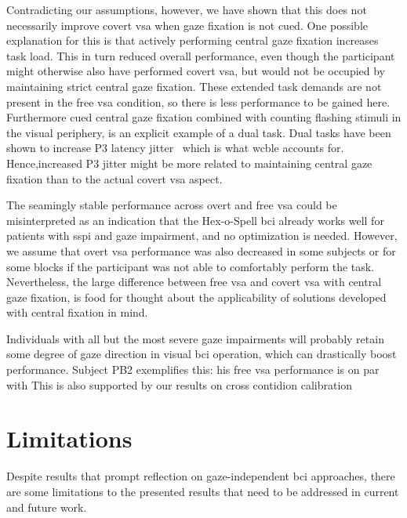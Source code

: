 Contradicting our assumptions, however, we have shown that this does not
necessarily improve covert \ac{vsa} when gaze fixation is not cued.
One possible explanation for this is that actively performing central gaze fixation
increases task load.
This in turn reduced overall performance, even though the participant might
otherwise also have performed covert \ac{vsa}, but would not be occupied by
maintaining strict central gaze fixation.
These extended task demands are not present in the free \ac{vsa} condition, so
there is less performance to be gained here.
Furthermore cued central gaze fixation combined with counting flashing stimuli
in the visual periphery, is an explicit example of a dual task.
Dual tasks have been shown to increase P3 latency
jitter~\cite{Polich2007,Arico2014, VanDenKerchove2024}
which is what \ac{wcble} accounts for.
Hence,increased P3 jitter might be more related to maintaining central gaze fixation
than to the actual covert \ac{vsa} aspect.

The seamingly stable performance across overt and free \ac{vsa} could be
misinterpreted as an indication that the Hex-o-Spell \ac{bci} already works
well for patients with \ac{sspi} and gaze impairment, and no optimization is
needed.
However, we assume that overt \ac{vsa} performance was also decreased in some
subjects or for some blocks if the participant was not able to comfortably
perform the task.
Nevertheless, the large difference between free \ac{vsa} and covert \ac{vsa}
with central gaze fixation, is food for thought about the applicability of
solutions developed with central fixation in mind.

Individuals with all but the most severe gaze impairments will probably retain
some degree of gaze direction in visual \ac{bci} operation, which can
drastically boost performance.
Subject PB2 exemplifies this: his free \ac{vsa} performance is on par with
This is also supported by our results on cross contidion calibration


\section{Limitations}

Despite results that prompt reflection on gaze-independent \ac{bci} approaches,
there are some limitations to the presented results that need to be
addressed in current and future work.

